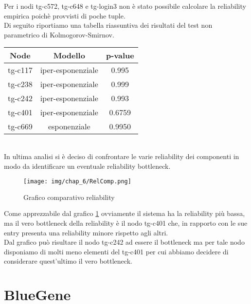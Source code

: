 \noindent
Per i nodi tg-c572, tg-c648 e tg-login3 non è stato possibile calcolare la reliability empirica poichè provvisti di poche tuple.\\
Di seguito riportiamo una tabella riassuntiva dei risultati del test non parametrico di Kolmogorov-Smirnov.\\
 \begin{table}[htbp]
    \centering
    \label{tab:esempio}
    \begin{tabular}{|c|c|c|} %
        \hline
        Node & Modello &p-value \\ %
        \hline
        tg-c117 & iper-esponenziale & 0.995 \\
        tg-c238 & iper-esponenziale & 0.999 \\
        tg-c242 & iper-esponenziale & 0.993 \\
        tg-c401 & iper-esponenziale & 0.6759 \\
        tg-c669 & esponenziale & 0.9950 \\
        \hline
    \end{tabular}
\end{table}\\
In ultima analisi si è deciso di confrontare le varie reliability dei componenti in modo da identificare un eventuale reliability bottleneck.\\
 \begin{figure}[H]
	\centering
	\texttt{[image: img/chap\_6/RelComp.png]}
	\caption{Grafico comparativo reliability}
	\label{fig:SuntoReliab}
\end{figure}
\noindent
Come apprezzabile dal grafico \ref{fig:SuntoReliab} ovviamente il sistema ha la reliability più bassa, ma il vero bottleneck della reliability è il nodo tg-c401 che, in rapporto con le sue entry presenta una reliability minore rispetto agli altri.\\
Dal grafico può risultare il nodo tg-c242 ad essere il bottleneck ma per tale nodo disponiamo di molti meno elementi del tg-c401 per cui abbiamo decidere di considerare quest'ultimo il vero bottleneck.
\section{BlueGene}
